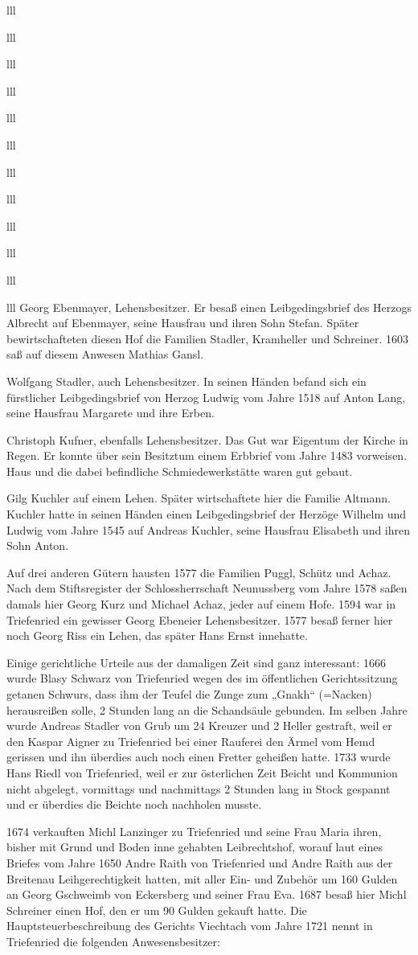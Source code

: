 \documentclass[12pt,a4pager]{book}
\begin{document}
\begin{tabuluar}{lll}
\begin{tabuluar}{lll}
\begin{tabuluar}{lll}
\begin{tabuluar}{lll}
\begin{tabuluar}{lll}
\begin{tabuluar}{lll}
\begin{tabuluar}{lll}
\begin{tabuluar}{lll}
\begin{tabuluar}{lll}
\begin{tabuluar}{lll}
\begin{tabuluar}{lll}
\begin{tabuluar}{lll}
Georg Ebenmayer, Lehensbesitzer. Er besaß einen Leibgedingsbrief des Herzogs
Albrecht auf Ebenmayer, seine Hausfrau und ihren Sohn Stefan. Später
bewirtschafteten diesen Hof die Familien Stadler, Kramheller und Schreiner. 1603
saß auf diesem Anwesen Mathias Gansl.

Wolfgang Stadler, auch Lehensbesitzer. In seinen Händen befand sich ein
fürstlicher Leibgedingsbrief von Herzog Ludwig vom Jahre 1518 auf Anton Lang,
seine Hausfrau Margarete und ihre Erben.

Christoph Kufner, ebenfalls Lehensbesitzer. Das Gut war Eigentum der Kirche in
Regen. Er konnte über sein Besitztum einem Erbbrief vom Jahre 1483 vorweisen.
Haus und die dabei befindliche Schmiedewerkstätte waren gut gebaut.

Gilg Kuchler auf einem Lehen. Später wirtschaftete hier die Familie Altmann.
Kuchler hatte in seinen Händen einen Leibgedingsbrief der Herzöge Wilhelm und
Ludwig vom Jahre 1545 auf Andreas Kuchler, seine Hausfrau Elisabeth und ihren
Sohn Anton.

Auf drei anderen Gütern hausten 1577 die Familien Puggl, Schütz und Achaz. Nach
dem Stiftsregister der Schlossherrschaft Neunussberg vom Jahre 1578 saßen damals
hier Georg Kurz und Michael Achaz, jeder auf einem Hofe. 1594 war in Triefenried
ein gewisser Georg Ebeneier Lehensbesitzer. 1577 besaß ferner hier noch Georg
Riss ein Lehen, das später Hans Ernst innehatte.

Einige gerichtliche Urteile aus der damaligen Zeit sind ganz interessant: 1666
wurde Blasy Schwarz von Triefenried wegen des im öffentlichen Gerichtssitzung
getanen Schwurs, dass ihm der Teufel die Zunge zum „Gnakh“ (=Nacken)
herausreißen solle, 2 Stunden lang an die Schandsäule gebunden. Im selben Jahre
wurde Andreas Stadler von Grub um 24 Kreuzer und 2 Heller gestraft, weil er den
Kaspar Aigner zu Triefenried bei einer Rauferei den Ärmel vom Hemd gerissen und
ihn überdies auch noch einen Fretter geheißen hatte. 1733 wurde Hans Riedl von
Triefenried, weil er zur österlichen Zeit Beicht und Kommunion nicht abgelegt,
vormittags und nachmittags 2 Stunden lang in Stock gespannt und er überdies die
Beichte noch nachholen musste.

1674 verkauften Michl Lanzinger zu Triefenried und seine Frau Maria ihren,
bisher mit Grund und Boden inne gehabten Leibrechtshof, worauf laut eines
Briefes vom Jahre 1650 Andre Raith von Triefenried und Andre Raith aus der
Breitenau Leihgerechtigkeit hatten, mit aller Ein- und Zubehör um 160 Gulden an
Georg Gschweimb von Eckersberg und seiner Frau Eva. 1687 besaß hier Michl
Schreiner einen Hof, den er um 90 Gulden gekauft hatte. Die
Hauptsteuerbeschreibung des Gerichts Viechtach vom Jahre 1721 nennt in
Triefenried die folgenden Anwesensbesitzer:


\end{tabuluar}
\end{tabuluar}
\end{tabuluar}
\end{tabuluar}
\end{tabuluar}
\end{tabuluar}
\end{tabuluar}
\end{tabuluar}
\end{tabuluar}
\end{tabuluar}
\end{tabuluar}
\end{tabuluar}
\end{document}
